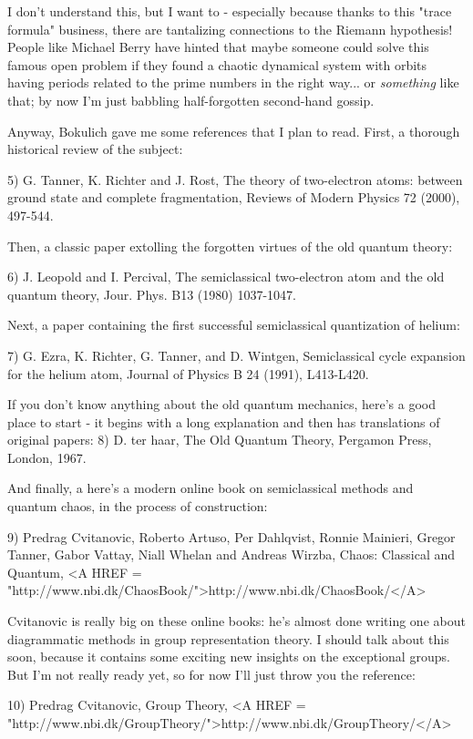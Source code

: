 I don't understand this, but I want to - especially because thanks
to this "trace formula" business, there are tantalizing connections 
to the Riemann hypothesis!  People like Michael Berry have hinted 
that maybe someone could solve this famous open problem if they
found a chaotic dynamical system with orbits having periods related
to the prime numbers in the right way... or \emph{something} like that; 
by now I'm just babbling half-forgotten second-hand gossip.  

Anyway, Bokulich gave me some references that I plan to read.  First, 
a thorough historical review of the subject:

5) G. Tanner, K. Richter and J. Rost, The theory of two-electron 
atoms: between ground state and complete fragmentation, Reviews of 
Modern Physics 72 (2000), 497-544.

Then, a classic paper extolling the forgotten virtues of the
old quantum theory:

6) J. Leopold and I. Percival, The semiclassical two-electron 
atom and the old quantum theory, Jour. Phys. B13 (1980) 1037-1047.

Next, a paper containing the first successful semiclassical 
quantization of helium:

7) G. Ezra, K. Richter, G. Tanner, and D. Wintgen, Semiclassical 
cycle expansion for the helium atom, Journal of Physics B 24 (1991), 
L413-L420.  

If you don't know anything about the old quantum mechanics,
here's a good place to start - it begins with a long
explanation and then has translations of original papers:
8) D. ter haar, The Old Quantum Theory, Pergamon Press, London, 
1967.

And finally, a here's a modern online book on semiclassical
methods and quantum chaos, in the process of construction:

9) Predrag Cvitanovic, Roberto Artuso, Per Dahlqvist, Ronnie
Mainieri, Gregor Tanner, Gabor Vattay, Niall Whelan and Andreas
Wirzba, Chaos: Classical and Quantum, 
<A HREF = "http://www.nbi.dk/ChaosBook/">http://www.nbi.dk/ChaosBook/</A>
 
Cvitanovic is really big on these online books: he's almost done 
writing one about diagrammatic methods in group representation 
theory.  I should talk about this soon, because it contains some
exciting new insights on the exceptional groups.   But I'm not really 
ready yet, so for now I'll just throw you the reference:

10) Predrag Cvitanovic, Group Theory, <A HREF = "http://www.nbi.dk/GroupTheory/">http://www.nbi.dk/GroupTheory/</A>

